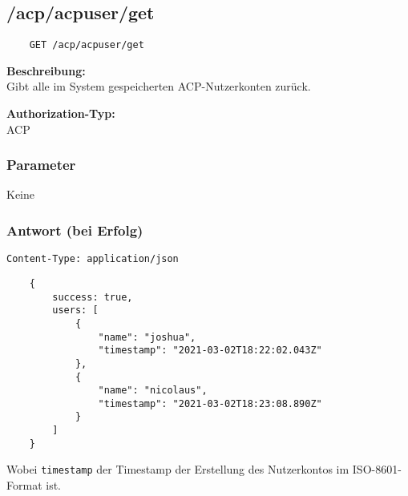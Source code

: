 \subsection{/acp/acpuser/get}

\begin{lstlisting}
    GET /acp/acpuser/get
\end{lstlisting}

\textbf{Beschreibung:} \\
Gibt alle im System gespeicherten ACP-Nutzerkonten zurück.

\textbf{Authorization-Typ:} \\
ACP

\subsubsection{Parameter}
Keine

\subsubsection{Antwort (bei Erfolg)}

\lstinline{Content-Type: application/json}
\begin{lstlisting}
    {
        success: true, 
        users: [
            {
                "name": "joshua",
                "timestamp": "2021-03-02T18:22:02.043Z"
            },
            {
                "name": "nicolaus",
                "timestamp": "2021-03-02T18:23:08.890Z"
            }
        ]
    }
\end{lstlisting}

Wobei \lstinline{timestamp} der Timestamp der Erstellung des Nutzerkontos im ISO-8601-Format ist.